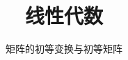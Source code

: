\documentclass[pt,notheorems]{beamer}
\begin{document}
\title{线性代数}
\subtitle{矩阵的初等变换与初等矩阵}


\begin{frame}[plain]\transboxout
\titlepage
\end{frame}

\begin{frame}[allowframebreaks]\transboxin
\begin{center}
\tableofcontents[hideallsubsections]
\end{center}
\end{frame}








%
\end{document}
